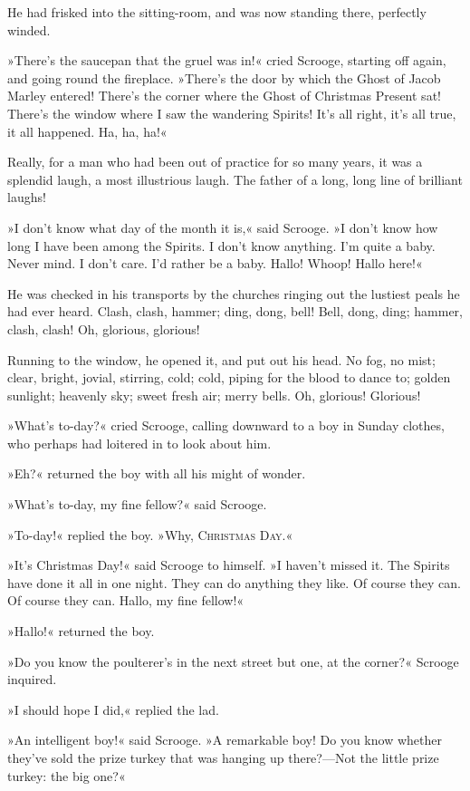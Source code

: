 He had frisked into the sitting-room, and was now standing there, perfectly winded.

»There's the saucepan that the gruel was in!« cried Scrooge, starting off again, and going round the fireplace. »There's the door by which the Ghost of Jacob Marley entered! There's the corner where the Ghost of Christmas Present sat! There's the window where I saw the wandering Spirits! It's all right, it's all true, it all happened. Ha, ha, ha!«

Really, for a man who had been out of practice for so many years, it was a splendid laugh, a most illustrious laugh. The father of a long, long line of brilliant laughs!

»I don't know what day of the month it is,« said Scrooge. »I don't know how long I have been among the Spirits. I don't know anything. I'm quite a baby. Never mind. I don't care. I'd rather be a baby. Hallo! Whoop! Hallo here!«

He was checked in his transports by the churches ringing out the lustiest peals he had ever heard. Clash, clash, hammer; ding, dong, bell! Bell, dong, ding; hammer, clash, clash! Oh, glorious, glorious!

Running to the window, he opened it, and put out his head. No fog, no mist; clear, bright, jovial, stirring, cold; cold, piping for the blood to dance to; golden sunlight; heavenly sky; sweet fresh air; merry bells. Oh, glorious! Glorious!

»What's to-day?« cried Scrooge, calling downward to a boy in Sunday clothes, who perhaps had loitered in to look about him.

»Eh?« returned the boy with all his might of wonder.

»What's to-day, my fine fellow?« said Scrooge.

»To-day!« replied the boy. »Why, \textsc{Christmas Day.}«

»It's Christmas Day!« said Scrooge to himself. »I haven't missed it. The Spirits have done it all in one night. They can do anything they like. Of course they can. Of course they can. Hallo, my fine fellow!«

»Hallo!« returned the boy.

»Do you know the poulterer's in the next street but one, at the corner?« Scrooge inquired.

»I should hope I did,« replied the lad.

»An intelligent boy!« said Scrooge. »A remarkable boy! Do you know whether they've sold the prize turkey that was hanging up there?—Not the little prize turkey: the big one?«


